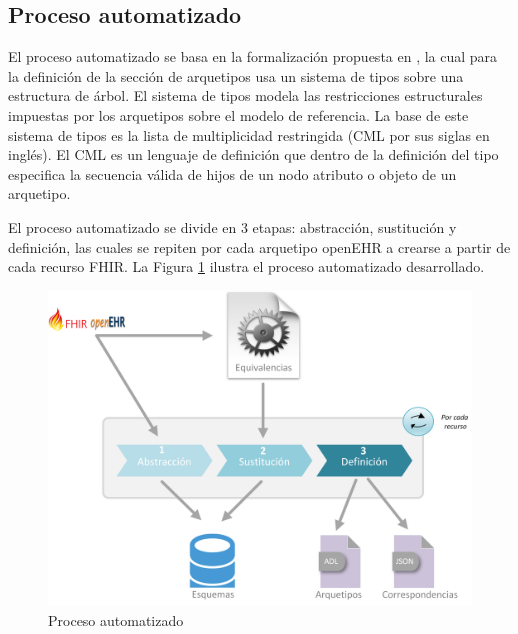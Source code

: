 \subsection{Proceso automatizado}

El proceso automatizado se basa en la formalización propuesta en \cite{Maldonado09}, la cual para la definición de la sección de arquetipos usa un sistema de tipos sobre una estructura de árbol. El sistema de tipos modela las restricciones estructurales impuestas por los arquetipos sobre el modelo de referencia. La base de este sistema de tipos es la lista de multiplicidad restringida (CML por sus siglas en inglés). El CML es un lenguaje de definición que dentro de la definición del tipo especifica la secuencia válida de hijos de un nodo atributo o objeto de un arquetipo.

El proceso automatizado se divide en 3 etapas: abstracción, sustitución y definición, las cuales se repiten por cada arquetipo openEHR a crearse a partir de cada recurso FHIR. La Figura \ref{fig:solution} ilustra el proceso automatizado desarrollado.

\begin{figure}[h]
  \centering
  \includegraphics[scale=0.5]{./images/solution}
  \caption{Proceso automatizado}
  \label{fig:solution}
\end{figure}






